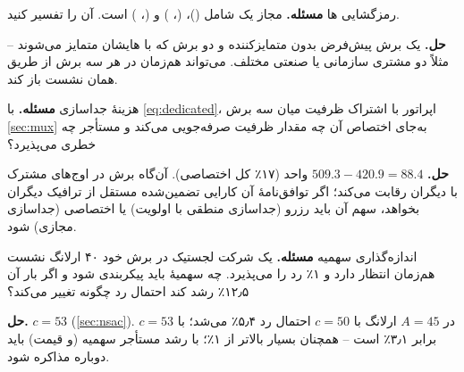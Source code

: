 \documentclass[11pt,a4paper]{article}
\begin{document}
\begin{examplebox}{رمزگشایی ها}\label{ex:snssai}
\textbf{مسئله.}  مجاز یک  شامل ()، (، ) و (، ) است.
آن را تفسیر کنید.

\textbf{حل.} یک برش پیش‌فرض  بدون متمایزکننده و دو برش  که با هایشان متمایز می‌شوند -- مثلاً دو مشتری سازمانی یا
صنعتی مختلف.  می‌تواند هم‌زمان در هر سه برش از طریق همان  نشست  باز کند.
\end{examplebox}

\begin{examplebox}{هزینهٔ جداسازی}\label{ex:mux}
\textbf{مسئله.} با \cref{eq:dedicated}، اپراتور با اشتراک ظرفیت  میان سه برش \cref{sec:mux} به‌جای اختصاص آن چه مقدار ظرفیت صرفه‌جویی
می‌کند و مستأجر  چه خطری می‌پذیرد؟

\textbf{حل.} $509.3 - 420.9 = 88.4$ واحد (۱۷٪ کل اختصاصی). آن‌گاه برش  در اوج‌های مشترک با دیگران رقابت می‌کند؛ اگر توافق‌نامهٔ آن
کارایی تضمین‌شده مستقل از ترافیک دیگران بخواهد، سهم آن باید رزرو (جداسازی منطقی با اولویت) یا اختصاصی (جداسازی مجازی) شود.
\end{examplebox}

\begin{examplebox}{اندازه‌گذاری سهمیه}\label{ex:nsac}
\textbf{مسئله.} یک شرکت لجستیک در برش خود ۴۰ ارلانگ نشست هم‌زمان انتظار دارد و ۱٪ رد را می‌پذیرد. چه سهمیهٔ  باید پیکربندی
شود و اگر بار آن ۱۲٫۵٪ رشد کند احتمال رد چگونه تغییر می‌کند؟

\textbf{حل.} $c = 53$ (\cref{sec:nsac}). در $A = 45$ ارلانگ با $c = 50$ احتمال رد ۵٫۴٪ می‌شد؛ با $c = 53$ برابر ۳٫۱٪ است -- همچنان بسیار
بالاتر از ۱٪؛ با رشد مستأجر سهمیه (و قیمت) باید دوباره مذاکره شود.
\end{examplebox}

\end{document}
